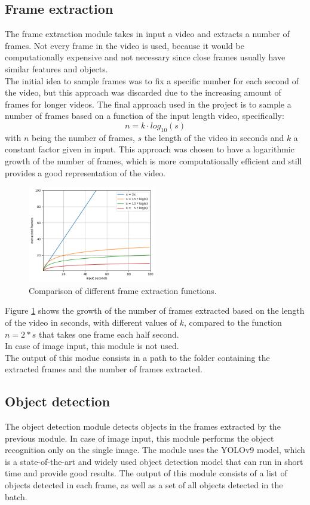 \documentclass[conference]{IEEEtran}
\begin{document}
\subsection{Frame extraction}
The frame extraction module takes in input a video and extracts a number of frames. 
Not every frame in the video is used, because it would be computationally expensive and not necessary since close frames usually have similar features and objects.\\
The initial idea to sample frames was to fix a specific number for each second of the video, 
but this approach was discarded due to the increasing amount of frames for longer videos. The final approach used in the project is to sample a number of frames based on a function of the input length video, specifically:
$$n = k \cdot log_{10}(s)$$
with $n$ being the number of frames, $s$ the length of the video in seconds and $k$ a constant factor given in input. This approach was chosen to have a logarithmic growth of the number of frames, which is more computationally efficient and still provides a good representation of the video.\\
\begin{figure}[h]
    \centerline{\includegraphics[width=0.5\textwidth]{frame_extr.png}}
    \caption{Comparison of different frame extraction functions.}
    \label{frame_extraction}
\end{figure}

Figure \ref{frame_extraction} shows the growth of the number of frames extracted based on the length 
of the video in seconds, with different values of $k$, compared to the function $n = 2 * s$ that takes one frame each half second. \\
In case of image input, this module is not used. \\
The output of this modue consists in a path to the folder containing the extracted frames and the number of frames extracted.
\subsection{Object detection}
The object detection module detects objects in the frames extracted by the previous module. In case of image input, this module performs the object recognition only on the single image. 
The module uses the YOLOv9 \cite{yolo} model, which is a state-of-the-art and widely used object detection model that can run in short time and provide good results.
The output of this module consists of a list of objects detected in each frame, as well as a set of all objects detected in the batch.
\end{document}
